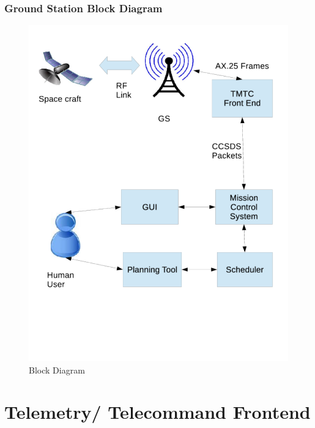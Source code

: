 \documentclass{beamer}
\begin{document}
\begin{frame}
\frametitle{Ground Station Block Diagram}
\begin{figure}
\includegraphics[scale = 0.3 ]{gs.pdf}
\caption{Block Diagram}
\label{fig1:gs}
\end{figure}

\end{frame}


\section{Telemetry/ Telecommand Frontend}
\end{document}
